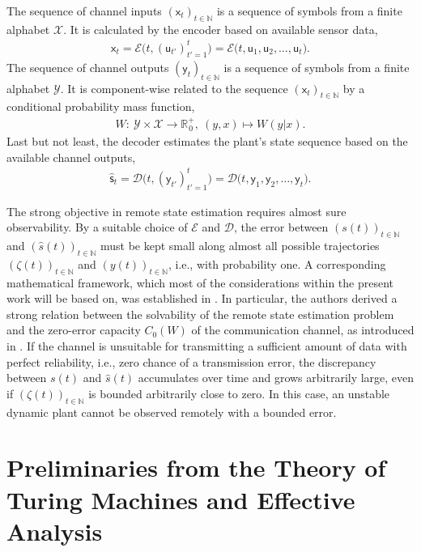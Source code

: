\documentclass[conference]{IEEEtran}
\newcommand{\rx}{\mathsf{x}}
\newcommand{\ry}{\mathsf{y}}
\newcommand{\rs}{\mathsf{s}}
\newcommand{\ru}{\mathsf{u}}
\def\E{{\mathcal E}}
\def\D{{\mathcal D}}
\def\X{{\mathcal X}}
\def\Y{{\mathcal Y}}
\def\NN{{\mathbb N}}
\def\RR{{\mathbb R}}
\begin{document}
	The sequence of channel inputs \((\rx_t)_{t\in\NN}\) is a sequence
	of symbols from a finite alphabet \(\X\). It is calculated by the encoder based on available sensor data,
	\begin{align*}	\rx_t   = \E \big(t, (\ru_{t'})_{t'=1}^{t}\big) 
							= \E\big(t, \ru_1,\ru_2,\ldots,\ru_t\big).
	\end{align*} 
	The sequence of channel outputs \((\ry_t)_{t\in\NN}\) is a sequence
	of symbols from a finite alphabet \(\Y\). It is component-wise related to the sequence \((\rx_t)_{t\in\NN}\) by a conditional probability mass function,
	\begin{align*}	W :~ \Y \times \X \rightarrow \RR_{\hspace{1pt}0}^+,~(y,x) \mapsto W(y|x).
	\end{align*}
	Last but not least, the decoder estimates the plant's state sequence based on the available channel outputs,
	\begin{align*}	\hat{\rs}_t  	= \D \big(t, (\ry_{t'})_{t'=1}^{t}\big)  
									= \D\big(t,\ry_1,\ry_2,\ldots,\ry_t\big).
	\end{align*}

	The strong objective in remote state estimation requires almost sure observability. By a suitable choice of \(\E\) and \(\D\), the error between \((s(t))_{t\in\NN}\)
	and \((\hat{s}(t))_{t\in\NN}\) must be kept small along almost all possible trajectories \((\zeta(t))_{t\in\NN}\) and \((y(t))_{t\in\NN}\), i.e., with probability one.
	A corresponding mathematical framework, which most of the considerations within the present work will be based on, was established in \cite{MS07}.
	In particular, the authors derived a strong relation between the solvability of the remote state estimation problem and the zero-error capacity \(C_0(W)\) of the 
	communication channel, as introduced in \cite{Sh56}. If the channel is unsuitable for transmitting a sufficient amount of data with perfect reliability, i.e., zero 
	chance of a transmission error, the discrepancy between \(s(t)\) and \(\hat{s}(t)\) accumulates over time and grows arbitrarily large, even if \((\zeta(t))_{t\in\NN}\) 
	is bounded arbitrarily close to zero. In this case, an unstable dynamic plant cannot be observed remotely with a bounded error. 

\section{Preliminaries from the Theory of Turing Machines and Effective Analysis}\label{sec:introTuring}
	
\end{document}
